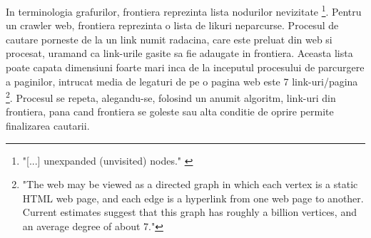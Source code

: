 In terminologia grafurilor, frontiera reprezinta lista nodurilor nevizitate \footnote{"[...] unexpanded (unvisited) nodes." \cite{PantSrinivasanMenczer} }. Pentru un crawler web, frontiera reprezinta o lista de likuri neparcurse. Procesul de cautare porneste de la un link numit radacina, care este preluat din web si procesat, uramand ca link-urile gasite sa fie adaugate in frontiera. Aceasta lista poate capata dimensiuni foarte mari inca de la inceputul procesului de parcurgere a paginilor, intrucat media de legaturi de pe o pagina web este 7 link-uri/pagina \footnote{"The web  may  be  viewed  as  a  directed  graph  in  which each vertex is a static HTML web page, and each edge is a hyperlink from one web page to another. Current estimates suggest that this graph has roughly a billion vertices, and an average degree of about 7."\cite{StochasticModels}}. Procesul se repeta, alegandu-se, folosind un anumit algoritm, link-uri din frontiera, pana cand frontiera se goleste sau alta conditie de oprire permite finalizarea cautarii.
\\